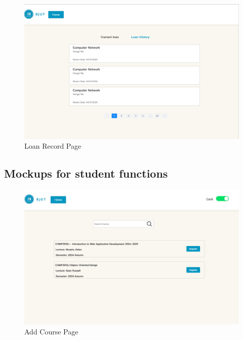 \documentclass[12pt]{article}
\begin{document}
\begin{figure}[H]
    \centering
    \includegraphics[width=\textwidth]{mockups/common/loanrecord.png}
    \caption{Loan Record Page}
    \label{fig:loanrecord_page}
\end{figure}

\subsection{Mockups for student functions}

\begin{figure}[H]
    \centering
    \includegraphics[width=\textwidth]{mockups/student/addcourse.png}
    \caption{Add Course Page}
    \label{fig:addcourse_page}
\end{figure}
\end{document}
